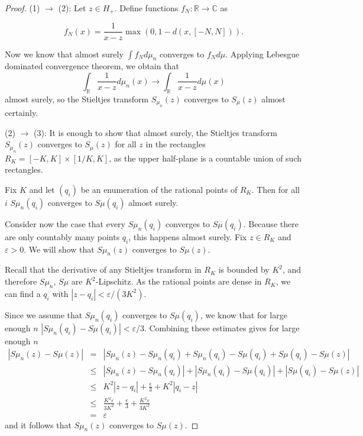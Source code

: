 \documentclass[12pt,a4paper,leqno]{report}
\newcommand{\R}{\mathbb{R}}
\newcommand{\C}{\mathbb{C}}
\newcommand{\eps}{\varepsilon}
\theoremstyle{plain}
\theoremstyle{definition}
\theoremstyle{remark}
\begin{document}
\begin{proof}
(1) $\rightarrow$ (2): Let $z \in H_+$. Define functions $f_N : \R \to \C$ as 

\begin{equation*}
f_N (x) = \frac{1}{x-z} \max(0,1-d(x,[-N,N])).
\end{equation*}

Now we know that almost surely $\int f_N d\mu_n$ converges to $f_N d\mu$. Applying Lebesgue dominated convergence theorem, we obtain that
\begin{equation*}
\int_{\R} \frac{1}{x-z} d\mu_n(x) \to 
\int_{\R} \frac{1}{x-z} d\mu(x)
\end{equation*}
almost surely, so the Stieltjes transform $S_{\mu_n}(z)$ converges to $S_{\mu}(z)$ almost certainly.

(2) $\rightarrow$ (3): It is enough to show that almost surely, the Stieltjes transform $S_{\mu_n}(z)$ converges to $S_{\mu}(z)$ for all $z$ in the rectangles $R_K = [-K,K] \times [1/K,K]$, as the upper half-plane is a countable union of such rectangles.

Fix $K$ and let $(q_i)$ be an enumeration of the rational points of $R_K$. Then for all $i$ $S\mu_n(q_i)$ converges to $S\mu(q_i)$ almost surely.

Consider now the case that every $S\mu_n(q_i)$ converges to $S\mu(q_i)$.
Because there are only countably many points $q_i$, this happens almost surely. Fix $z \in R_K$ and $\eps > 0$. We will show that $S\mu_n(z)$ converges to $S\mu(z)$.

Recall that the derivative of any Stieltjes transform in $R_K$ is bounded by $K^2$, and therefore $S\mu_n$, $S\mu$ are $K^2$-Lipschitz. As the rational points are dense in $R_K$, we can find a $q_i$ with 
$|z-q_i|< \eps /(3K^2)$.

Since we assume that $S\mu_n(q_i)$ converges to $S\mu(q_i)$, we know that for large enough $n$ $|S\mu_n(q_i)-S\mu(q_i)|< \eps / 3$. Combining these estimates gives for large enough $n$
\begin{eqnarray*}
|S\mu_n(z)-S\mu(z)| & = & |S\mu_n(z)-S\mu_n(q_i) + S\mu_n(q_i)-S\mu(q_i)+S\mu(q_i)-S\mu(z)|\\
& \leq & |S\mu_n(z)-S\mu_n(q_i)| + |S\mu_n(q_i)-S\mu(q_i)|+|S\mu(q_i)-S\mu(z)|\\
& \leq & K^2|z-q_i| + \frac{\epsilon}{3} + K^2|q_i-z|\\
& \leq & \frac{K^2\eps}{3K^2} + \frac{\epsilon}{3} + \frac{K^2\eps}{3K^2}\\
& = & \eps
\end{eqnarray*}
and it follows that $S\mu_n(z)$ converges to $S\mu(z)$.


\end{proof}
\end{document}
